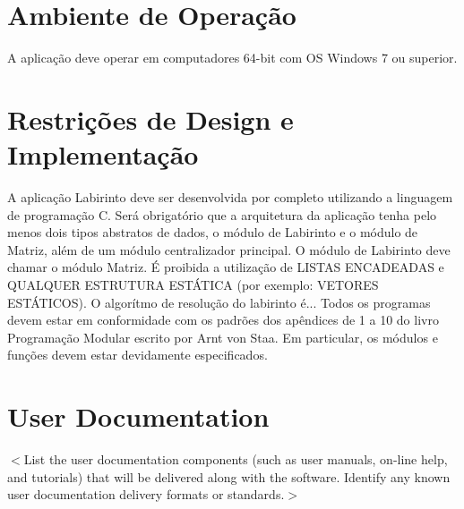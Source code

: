 \section{Ambiente de Operação}
A aplicação deve operar em computadores 64-bit com OS Windows 7 ou superior.

\section{Restrições de Design e Implementação}
A aplicação Labirinto deve ser desenvolvida por completo utilizando a linguagem de programação C. Será obrigatório que a arquitetura da aplicação tenha pelo menos dois tipos abstratos de dados, o módulo de Labirinto e o módulo de Matriz, além de um módulo centralizador principal. O módulo de Labirinto deve chamar o módulo Matriz. É proibida a utilização de LISTAS ENCADEADAS e QUALQUER ESTRUTURA ESTÁTICA (por exemplo: VETORES ESTÁTICOS). O algorítmo de resolução do labirinto é... Todos os programas devem estar em conformidade com os padrões dos apêndices de 1 a 10 do livro Programação Modular escrito por Arnt von Staa. Em particular, os módulos e funções devem estar devidamente especificados.

\section{User Documentation}
$<$List the user documentation components (such as user manuals, on-line help,
and tutorials) that will be delivered along with the software. Identify any
known user documentation delivery formats or standards.$>$

